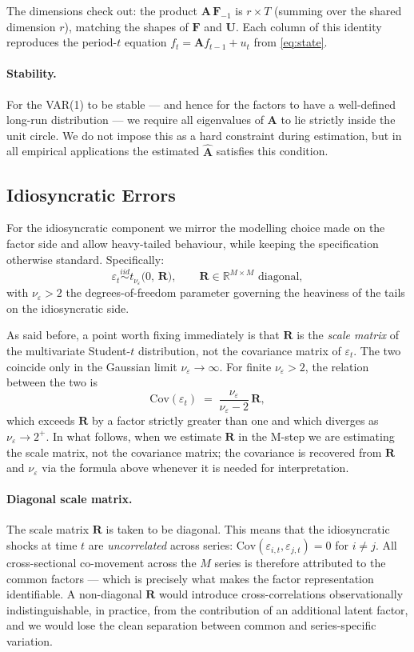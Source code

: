 \documentclass[11pt, a4paper, oneside]{article}
\newcommand{\mF}{\mathbf{F}}
\newcommand{\mA}{\mathbf{A}}
\newcommand{\mR}{\mathbf{R}}
\begin{document}
The dimensions check out: the product $\mA\,\mF_{-1}$ is $r \times T$
(summing over the shared dimension $r$), matching the shapes of $\mF$
and $\mathbf{U}$. Each column of this identity reproduces the
period-$t$ equation $f_t = \mA f_{t-1} + u_t$ from \eqref{eq:state}.

\paragraph{Stability.}
For the VAR(1) to be stable — and hence for the factors to have a
well-defined long-run distribution — we require all eigenvalues of
$\mA$ to lie strictly inside the unit circle. We do not impose
this as a hard constraint during estimation, but in all empirical
applications the estimated $\widehat{\mA}$ satisfies this condition.

\subsection{Idiosyncratic Errors}

For the idiosyncratic component we mirror the modelling choice made on
the factor side and allow heavy-tailed behaviour, while keeping the
specification otherwise standard. Specifically:
\begin{equation}
\varepsilon_t \overset{iid}{\sim} t_{\nu_\varepsilon}\!\big(0,\, \mR\big),
\qquad \mR \in \mathbb{R}^{M \times M} \text{ diagonal},
\label{eq:idio}
\end{equation}
with $\nu_\varepsilon > 2$ the degrees-of-freedom parameter governing
the heaviness of the tails on the idiosyncratic side.

As said before, a point worth fixing immediately is that $\mR$ is the \emph{scale
matrix} of the multivariate Student-$t$ distribution, not the
covariance matrix of $\varepsilon_t$. The two coincide only in the
Gaussian limit $\nu_\varepsilon \to \infty$. For finite
$\nu_\varepsilon > 2$, the relation between the two is
\[
\mathrm{Cov}(\varepsilon_t) \;=\; \frac{\nu_\varepsilon}{\nu_\varepsilon - 2}\, \mR,
\]
which exceeds $\mR$ by a factor strictly greater than one and which
diverges as $\nu_\varepsilon \to 2^+$. In what follows, when we
estimate $\mR$ in the M-step we are estimating the scale matrix, not
the covariance matrix; the covariance is recovered from $\mR$ and
$\nu_\varepsilon$ via the formula above whenever it is needed for
interpretation.

\paragraph{Diagonal scale matrix.}
The scale matrix $\mR$ is taken to be diagonal. This means that the
idiosyncratic shocks at time $t$ are \emph{uncorrelated} across
series: $\mathrm{Cov}(\varepsilon_{i,t}, \varepsilon_{j,t}) = 0$ for
$i \neq j$. All cross-sectional co-movement across the $M$ series is
therefore attributed to the common factors — which is precisely what
makes the factor representation identifiable. A non-diagonal $\mR$
would introduce cross-correlations observationally indistinguishable,
in practice, from the contribution of an additional latent factor,
and we would lose the clean separation between common and
series-specific variation.
\end{document}
